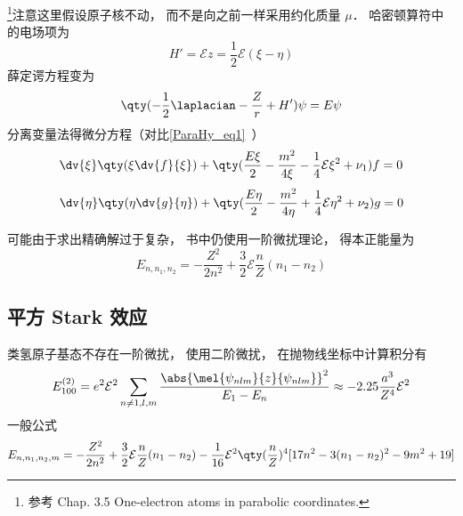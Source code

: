 
\begin{issues}
\issueDraft
\end{issues}


\footnote{参考 \cite{Brandsen} Chap. 3.5 One-electron atoms in parabolic coordinates.}注意这里假设原子核不动， 而不是向之前一样采用约化质量 $\mu$． 哈密顿算符中的电场项为
\begin{equation}
H' = \mathcal Ez = \frac12 \mathcal E (\xi - \eta)
\end{equation}
薛定谔方程变为
\begin{equation}
\qty(-\frac12 \laplacian - \frac{Z}{r} + H')\psi = E\psi
\end{equation}
分离变量法得微分方程（对比\autoref{ParaHy_eq1}~）
\begin{equation}
\dv{\xi} \qty(\xi \dv{f}{\xi}) + \qty(\frac{E \xi}{2} - \frac{m^2}{4\xi} -\frac14\mathcal E \xi^2 + \nu_1) f = 0
\end{equation}
\begin{equation}
\dv{\eta}\qty(\eta \dv{g}{\eta}) + \qty(\frac{E\eta}{2} - \frac{m^2}{4\eta} +\frac14\mathcal E \eta^2 + \nu_2)g = 0
\end{equation}

可能由于求出精确解过于复杂， 书中仍使用一阶微扰理论， 得本正能量为
\begin{equation}
E_{n,n_1,n_2} = -\frac{Z^2}{2n^2} + \frac32 \mathcal E \frac{n}{Z}(n_1 - n_2)
\end{equation}

\subsection{平方 Stark 效应}
类氢原子基态不存在一阶微扰， 使用二阶微扰， 在抛物线坐标中计算积分有
\begin{equation}
E_{100}^{(2)} = e^2\mathcal E^2 \sum_{n\ne 1, l, m} \frac{\abs{\mel{\psi_{nlm}}{z}{\psi_{nlm}}}^2}{E_1 - E_n}
\approx - 2.25\frac{a^3}{Z^4} \mathcal E^2
\end{equation}
一般公式
\begin{equation}
E_{n,n_1,n_2,m} = -\frac{Z^2}{2n^2} + \frac32 \mathcal E \frac{n}{Z} (n_1-n_2)
-\frac{1}{16}\mathcal E^2 \qty(\frac{n}{Z})^4 [17n^2-3(n_1-n_2)^2-9m^2+19]
\end{equation}
